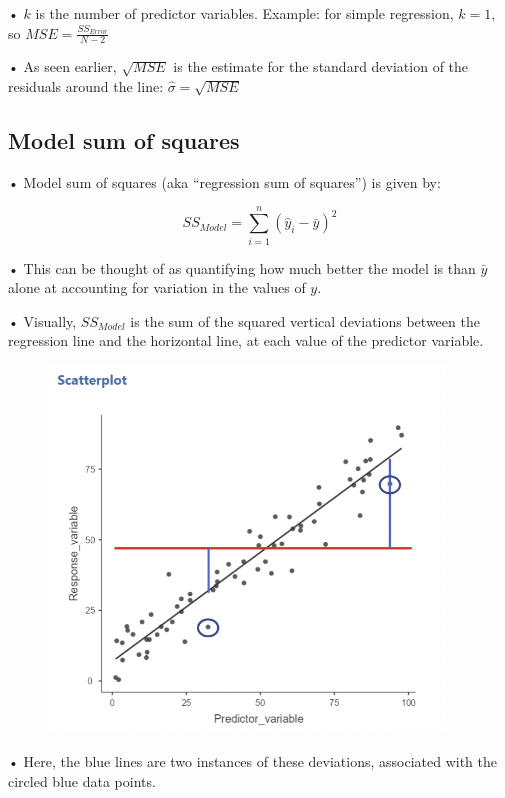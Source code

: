 \documentclass[
  letterpaper,
  DIV=11,
  numbers=noendperiod]{scrreprt}
\begin{document}
• \(k\) is the number of predictor variables. Example: for simple
regression, \(k = 1\), so \(MSE = \frac{SS_{Error}}{N-2}\)

• As seen earlier, \(\sqrt{MSE}\) is the estimate for the standard
deviation of the residuals around the line:
\(\hat{\sigma} = \sqrt{MSE}\)

\hypertarget{model-sum-of-squares}{%
\subsection{Model sum of squares}\label{model-sum-of-squares}}

• Model sum of squares (aka ``regression sum of squares'') is given by:

\[
SS_{Model} = \sum^n_{i=1}(\hat{y}_i - \bar{y})^2
\]

• This can be thought of as quantifying how much better the model is
than \(\bar{y}\) alone at accounting for variation in the values of
\(y\).

• Visually, \(SS_{Model}\) is the sum of the squared vertical deviations
between the regression line and the horizontal line, at each value of
the predictor variable.

\begin{figure}

{\centering \includegraphics[width=4.15625in,height=\textheight]{images/Mod2_pt1_3.png}

}

\end{figure}

• Here, the blue lines are two instances of these deviations, associated
with the circled blue data points.
\end{document}
